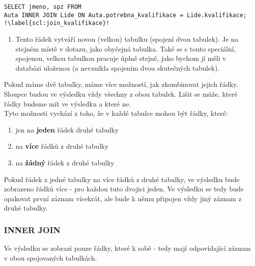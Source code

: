 \begin{minipage}[t]{.45\textwidth}
\begin{code}
\begin{verbatim}
SELECT jmeno, spz FROM
Auta INNER JOIN Lide ON Auta.potrebna_kvalifikace = Lide.kvalifikace; !\label{scl:join_kvalifikace}!
\end{verbatim}
\label{code:join_prvni}
\end{code}
\end{minipage}
\begin{minipage}[t]{.45\textwidth}
\vspace{1cm}
\begin{enumerate}
\item[ř. \ref{scl:vnoreni}:] Tento řádek vytváří novou (velkou) tabulku (spojení dvou tabulek). Je na stejném místě v dotazu, jako obyčejná tabulka. Také se s touto speciální, spojenou, velkou tabulkou pracuje úplně stejně, jako bychom jí měli v databázi uloženou (a nevznikla spojením dvou skutečných tabulek).
\end{enumerate}
\end{minipage}

\vspace{.5cm}
Pokud máme dvě tabulky, máme více možností, jak zkombinovat jejich řádky. Sloupce budou ve výsledku vždy všechny z obou tabulek. Lišit se může, které řádky budeme mít ve výsledku a které ne.\\
Tyto možnosti vychází z toho, že v každé tabulce mohou být řádky, které:
\begin{enumerate}
\item {} jen na \textbf{jeden} řádek druhé tabulky
\item  {} na \textbf{více} řádků z druhé tabulky
\item {} na \textbf{žádný} řádek z druhé tabulky
\end{enumerate}

Pokud řádek z jedné tabulky  na více řádků z druhé tabulky, ve výsledku bude zobrazeno řádků více - pro každou tuto dvojici jeden. Ve výsledku se tedy bude opakovat první záznam vícekrát, ale bude k němu připojen vždy jiný záznam z druhé tabulky.

\subsubsection{INNER JOIN}
Ve výsledku se zobrazí pouze řádky, které k sobě  - tedy mají odpovídající záznam v obou spojovaných tabulkách.

